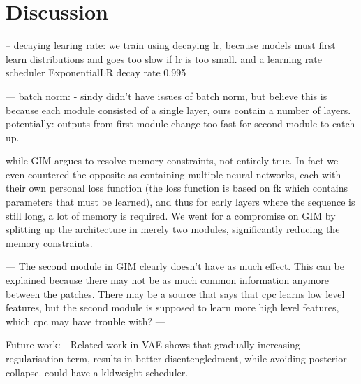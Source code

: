 \documentclass[]{book}
\begin{document}
\newcommand{\normalfatmusigma}[0]{\mathcal{N}(\mufat, \text{diag}(\sigmafat^2))}



\newcommand{\D}[0]{\mathcal{D}}
\newcommand{\X}[0]{\mathcal{X}}
\newcommand{\Z}[0]{\mathcal{Z}}
\newcommand{\Y}[0]{\mathcal{Y}}
\newcommand{\f}[0]{f(\cdot) }
\newcommand{\T}[0]{T(\cdot) }
\newcommand{\E}[0]{E(\cdot) }

\newcommand{\Dtrain}[0]{\D_{\text{train}}}

\newcommand{\xtith}[0]{\xt^{(i)}}
\newcommand{\xtjth}[0]{\xt^{(j)}}
\newcommand{\ztm}[0]{\zt^{m}}
\newcommand{\ztmnegone}[0]{\zt^{m-1}}







\chapter{Discussion}

-- 
decaying learing rate:
	we train using decaying lr, because models must first learn distributions and goes too slow if lr is too small.
	and a learning rate scheduler
	ExponentialLR
	decay rate 0.995

---
batch norm:
 - sindy didn't have issues of batch norm, but believe this is because each module consisted of a single layer, ours contain a number of layers. potentially: outputs from first module change too fast for second module to catch up.




while GIM argues to resolve memory constraints, not entirely true. In fact we even countered the opposite as containing multiple neural networks, each with their own personal loss function (the loss function is based on fk which contains parameters that must be learned), and thus for early layers where the sequence is still long, a lot of memory is required. We went for a compromise on GIM by splitting up the architecture in merely two modules, significantly reducing the memory constraints.


---
The second module in GIM clearly doesn't have as much effect. This can be explained because there may not be as much common information anymore between the patches. There may be a source that says that cpc learns low level features, but the second module is supposed to learn more high level features, which cpc may have trouble with?
---

Future work:
 - Related work in VAE shows that gradually increasing regularisation term, results in better disentengledment, while avoiding posterior collapse. could have a kldweight scheduler.
 
\end{document}
